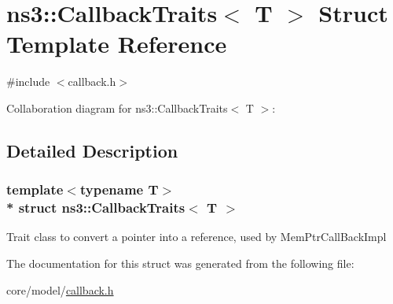 \hypertarget{structns3_1_1CallbackTraits}{}\section{ns3\+:\+:Callback\+Traits$<$ T $>$ Struct Template Reference}
\label{structns3_1_1CallbackTraits}


{\ttfamily \#include $<$callback.\+h$>$}



Collaboration diagram for ns3\+:\+:Callback\+Traits$<$ T $>$\+:


\subsection{Detailed Description}
\subsubsection*{template$<$typename T$>$\\*
struct ns3\+::\+Callback\+Traits$<$ T $>$}

Trait class to convert a pointer into a reference, used by Mem\+Ptr\+Call\+Back\+Impl 

The documentation for this struct was generated from the following file\+:\begin{DoxyCompactItemize}
\item 
core/model/\hyperlink{callback_8h}{callback.\+h}\end{DoxyCompactItemize}
